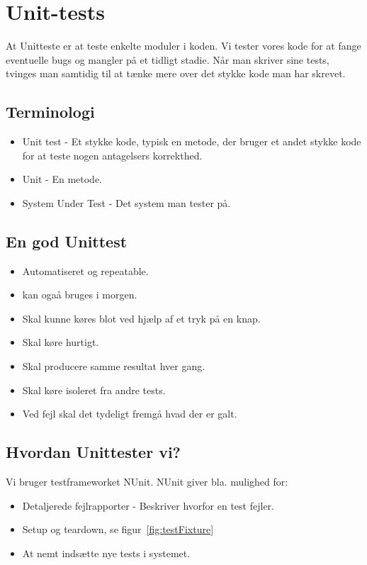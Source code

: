 \section{Unit-tests}
At Unitteste er at teste enkelte moduler i koden. Vi tester vores kode for at fange eventuelle bugs og mangler på et tidligt stadie. Når man skriver sine tests, tvinges man samtidig til at tænke mere over det stykke kode man har skrevet.

\subsection{Terminologi}
\begin{itemize}
	\item Unit test - Et stykke kode, typisk en metode, der bruger et andet stykke kode for at teste nogen antagelsers korrekthed.
	\item Unit - En metode.
	\item System Under Test - Det system man tester på.
\end{itemize}

\subsection{En god Unittest}
\begin{itemize}
	\item Automatiseret og repeatable.
	\item kan ogaå bruges i morgen.
	\item Skal kunne køres blot ved hjælp af et tryk på en knap.
	\item Skal køre hurtigt.
	\item Skal producere samme resultat hver gang.
	\item Skal køre isoleret fra andre tests.
	\item Ved fejl skal det tydeligt fremgå hvad der er galt.
\end{itemize}



\subsection{Hvordan Unittester vi?}

Vi bruger testframeworket NUnit. NUnit giver bla. mulighed for:

\begin{itemize}
	\item Detaljerede fejlrapporter - Beskriver hvorfor en test fejler.
	\item Setup og teardown, se figur~\ref{fig:testFixture}
	\item At nemt indsætte nye tests i systemet.
\end{itemize}

